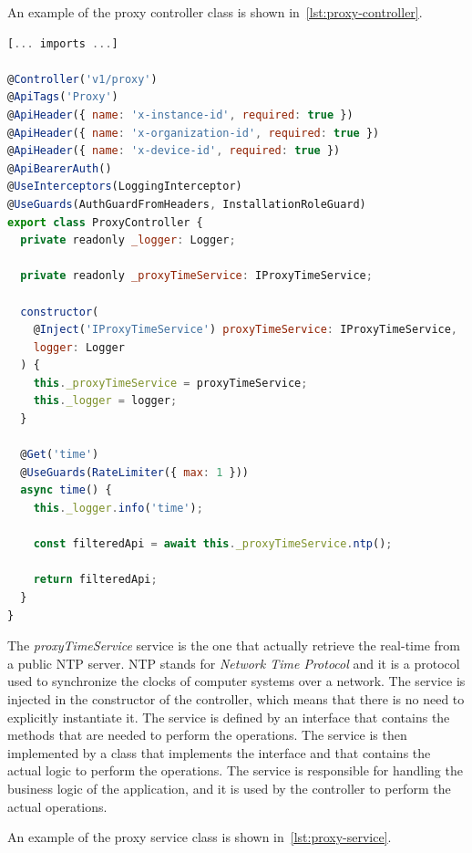 An example of the proxy controller class is shown in~\cref{lst:proxy-controller}.

\begin{lstlisting}[language=Javascript, caption={Proxy controller class}, label={lst:proxy-controller}]
[... imports ...]

@Controller('v1/proxy')
@ApiTags('Proxy')
@ApiHeader({ name: 'x-instance-id', required: true })
@ApiHeader({ name: 'x-organization-id', required: true })
@ApiHeader({ name: 'x-device-id', required: true })
@ApiBearerAuth()
@UseInterceptors(LoggingInterceptor)
@UseGuards(AuthGuardFromHeaders, InstallationRoleGuard)
export class ProxyController {
  private readonly _logger: Logger;

  private readonly _proxyTimeService: IProxyTimeService;

  constructor(
    @Inject('IProxyTimeService') proxyTimeService: IProxyTimeService,
    logger: Logger
  ) {
    this._proxyTimeService = proxyTimeService;
    this._logger = logger;
  }

  @Get('time')
  @UseGuards(RateLimiter({ max: 1 }))
  async time() {
    this._logger.info('time');

    const filteredApi = await this._proxyTimeService.ntp();

    return filteredApi;
  }
}
\end{lstlisting}

The \textit{proxyTimeService} service is the one that actually retrieve the real-time from a public NTP server. NTP stands for \textit{Network Time Protocol} and it is a protocol used to synchronize the clocks of computer systems over a network. The service is injected in the constructor of the controller, which means that there is no need to explicitly instantiate it. The service is defined by an interface that contains the methods that are needed to perform the operations. The service is then implemented by a class that implements the interface and that contains the actual logic to perform the operations. The service is responsible for handling the business logic of the application, and it is used by the controller to perform the actual operations.

An example of the proxy service class is shown in~\cref{lst:proxy-service}.

